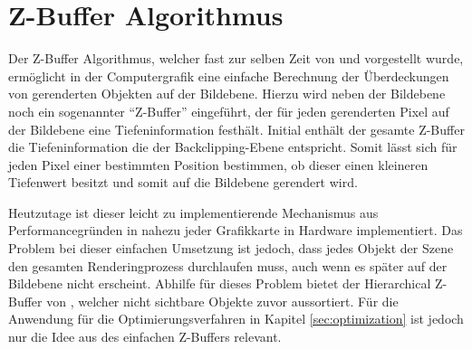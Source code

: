 
\section{Z-Buffer Algorithmus} \label{sec:z-buffer}

Der Z-Buffer Algorithmus, welcher fast zur selben Zeit von \citet{straber1974schnelle} und \citet{catmull1974subdivision} vorgestellt wurde, ermöglicht in der Computergrafik eine einfache Berechnung der Überdeckungen von gerenderten Objekten auf der Bildebene. Hierzu wird neben der Bildebene noch ein sogenannter \enquote{Z-Buffer} eingeführt, der für jeden gerenderten Pixel auf der Bildebene eine Tiefeninformation festhält. Initial enthält der gesamte Z-Buffer die Tiefeninformation die der Backclipping-Ebene entspricht. Somit lässt sich für jeden Pixel einer bestimmten Position bestimmen, ob dieser einen kleineren Tiefenwert besitzt und somit auf die Bildebene gerendert wird. 

Heutzutage ist dieser leicht zu implementierende Mechanismus aus Performancegründen in nahezu jeder Grafikkarte in Hardware implementiert. Das Problem bei dieser einfachen Umsetzung ist jedoch, dass jedes Objekt der Szene den gesamten Renderingprozess durchlaufen muss, auch wenn es später auf der Bildebene nicht erscheint. Abhilfe für dieses Problem bietet der Hierarchical Z-Buffer von \citet{greene1993hierarchical}, welcher nicht sichtbare Objekte zuvor aussortiert. Für die Anwendung für die Optimierungsverfahren in Kapitel \ref{sec:optimization} ist jedoch nur die Idee aus des einfachen Z-Buffers relevant.